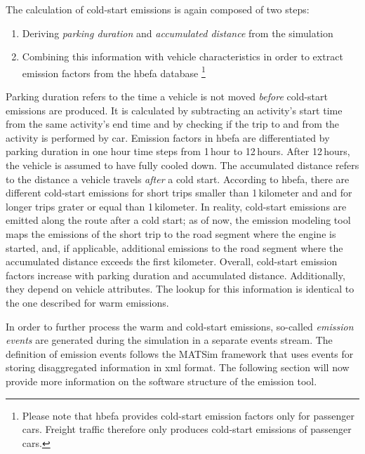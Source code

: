 {The calculation of cold-start emissions is again composed of two steps:
%
\begin{enumerate}
 \item Deriving \emph{parking duration} and \emph{accumulated distance} 
 from the simulation
 \item Combining this information with vehicle characteristics in order to 
 extract emission factors from the \gls{hbefa} database%
 \footnote{
 Please note that \gls{hbefa} provides cold-start emission factors only for 
 passenger cars. Freight traffic therefore only produces cold-start emissions 
 of passenger cars.
 }
\end{enumerate}
%
Parking duration refers to the time a vehicle is not moved \emph{before} 
cold-start emissions are produced. It is calculated by subtracting an 
activity's start time from the same activity's end time and by checking if the 
trip to and from the activity is performed by car. Emission factors in 
\gls{hbefa} 
are differentiated by parking duration in one hour time steps from 1\,hour to 
12\,hours. After 12\,hours, the vehicle is assumed to have fully cooled down.
%
The accumulated distance refers to the distance a vehicle travels \emph{after} 
a cold start. According to \gls{hbefa}, there are different cold-start 
emissions for short trips smaller than 1\,kilometer and and for longer trips grater or equal than 1\,kilometer.
%
In reality, cold-start emissions are emitted along the route after a cold start;
as of now, the emission modeling tool maps the emissions of the short trip to the road
segment where the engine is started, and, if applicable, additional emissions
to the road segment where the accumulated distance exceeds the first kilometer.
%
Overall, cold-start emission factors increase with parking duration and 
accumulated distance. Additionally, they depend on vehicle attributes. The 
lookup for this information is identical to the one described for warm 
emissions.

In order to further process the warm and cold-start emissions, so-called 
\emph{emission events} are generated during the simulation in a separate 
events stream. The definition of emission events follows the MATSim 
framework that uses events for storing disaggregated information in 
\acrshort{xml} format. The following section will now provide more information 
on the software structure of the emission tool.

}
